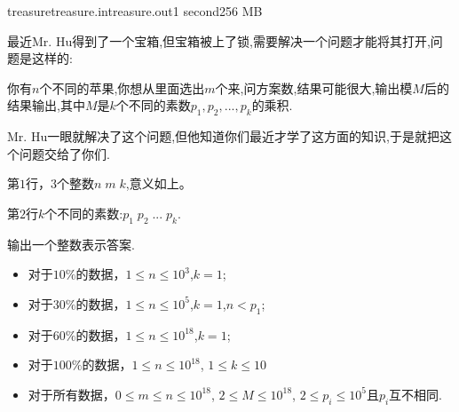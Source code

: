 \documentclass[11pt,a4paper,oneside]{article}
\begin{document}
\begin{problem}{treasure}{treasure.in}{treasure.out}{1 second}{256 MB}

	最近Mr. Hu得到了一个宝箱,但宝箱被上了锁,需要解决一个问题才能将其打开,问题是这样的:
	
	你有$n$个不同的苹果,你想从里面选出$m$个来,问方案数,结果可能很大,输出模$M$后的结果输出,其中$M$是$k$个不同的素数$p_1,p_2,...,p_k$的乘积.
	
	Mr. Hu一眼就解决了这个问题,但他知道你们最近才学了这方面的知识,于是就把这个问题交给了你们.
	

    \InputFile

    第$1$行，$3$个整数$n \; m \; k$,意义如上。
    
    第$2$行$k$个不同的素数:$p_1 \; p_2 \; ... \; p_k$.
   
    \OutputFile

	   输出一个整数表示答案.

    \Example

    \begin{example}
    \end{example}

    \Note
    
    \begin{itemize}
		\item 对于$10\%$的数据，$1 \leq n \leq 10^3$,$ k = 1 $;
        \item 对于$30\%$的数据，$1 \leq n \leq 10^5$,$ k = 1 $,$n < p_1$;
        \item 对于$60\%$的数据，$1 \leq n \leq 10^{18}$,$ k = 1 $; 
        \item 对于$100\%$的数据，$1 \leq n \leq 10^{18} $, $1 \leq k \leq 10 $
        \item 对于所有数据，$0 \leq m \leq n \leq 10^{18}$, $2 \leq M \leq 10^{18}$, $2 \leq p_i \leq 10^5$且$p_i$互不相同.
    \end{itemize}

\end{problem}
\end{document}
